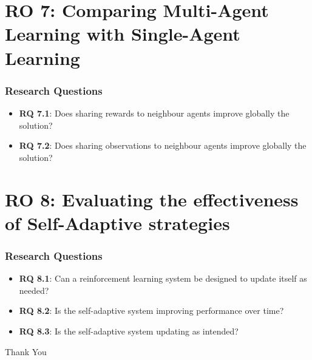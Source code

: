 \documentclass{beamer}
\begin{document}
\section{\textbf{RO 7}: Comparing Multi-Agent Learning with Single-Agent Learning}
\begin{frame}
\frametitle{Research Questions}
\begin{itemize}
\item \textbf{RQ 7.1}: Does sharing rewards to neighbour agents improve globally the solution?
\item \textbf{RQ 7.2}: Does sharing observations to neighbour agents improve globally the solution?
\end{itemize}
\end{frame}

\section{\textbf{RO 8}: Evaluating the effectiveness of Self-Adaptive strategies}
\begin{frame}
\frametitle{Research Questions}
\begin{itemize}
\item \textbf{RQ 8.1}: Can a reinforcement learning system be designed to update itself as needed?
\item \textbf{RQ 8.2}: Is the self-adaptive system improving performance over time?
\item \textbf{RQ 8.3}: Is the self-adaptive system updating as intended?
\end{itemize}
\end{frame}

\begin{frame}
\centering
\Huge
Thank You
\end{frame}
\end{document}
